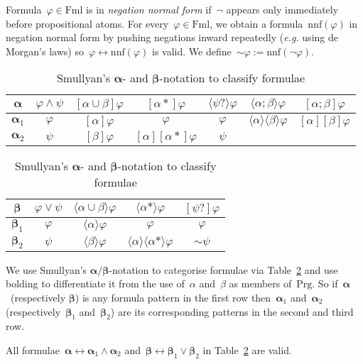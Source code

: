 \documentclass{entcs}
\newcommand{\eg}{\emph{e.g.}}
\newcommand{\pnot}[1]{\lnot #1}
\newcommand{\pneg}[1]{\sim\!#1}
\newcommand{\pand}[2]{#1 \land #2}
\newcommand{\por}[2]{#1 \lor #2}
\newcommand{\pea}[2]{\langle#1\rangle #2}
\newcommand{\paa}[2]{[#1] #2}
\newcommand{\psp}[2]{#1;#2}
\newcommand{\pup}[2]{#1\cup#2}
\newcommand{\prp}[1]{#1*}
\newcommand{\pip}[1]{#1?}
\newcommand{\peq}[2]{#1 \leftrightarrow #2}
\newcommand{\fml}{\mathrm{Fml}}
\newcommand{\prg}{\mathrm{Prg}}
\newcommand{\pnnf}[1]{\mathrm{nnf}(#1)}
\newcommand{\talpha}{\boldsymbol{\alpha}}
\newcommand{\tbeta}{\boldsymbol{\beta}}
\begin{document}
\begin{definition}
  Formula~$\varphi \in \fml$ is in \emph{negation normal form}
  if~$\pnot{}$ appears only immediately before propositional atoms.
  For every~$\varphi \in \fml$,
  we obtain a formula~$\pnnf{\varphi}$ in negation normal form
  by pushing negations inward repeatedly
  (\eg{} using de Morgan's laws)
  so~$\peq{\varphi}{\pnnf{\varphi}}$ is valid.
  We define~$\pneg{\varphi} := \pnnf{\pnot{\varphi}}$.
\end{definition}

\begin{table}[t]
  \caption{Smullyan's $\talpha$- and $\tbeta$-notation to classify formulae}
  \label{tab_alphabeta}
  \begin{center}
    \begin{tabular}{|c|c|c|c|c|c|c|}
      \hline
      $\talpha$ 
      & $\pand{\varphi}{\psi}$ 
      & $\paa{\pup{\alpha}{\beta}}{\varphi}$ 
      & $\paa{\prp{\alpha}}{\varphi}$ 
      & $\pea{\pip{\psi}}{\varphi}$ 
      & $\pea{\psp{\alpha}{\beta}}{\varphi}$ 
      & $\paa{\psp{\alpha}{\beta}}{\varphi}$ 
      \\ \hline
      $\talpha_1$ 
      & $\varphi$ 
      & $\paa{\alpha}{\varphi}$ 
      & $\varphi$ 
      & $\varphi$ 
      & $\pea{\alpha}{\pea{\beta}{\varphi}}$ 
      & $\paa{\alpha}{\paa{\beta}{\varphi}}$ 
      \\ \hline
      $\talpha_2$
      & $\psi$
      & $\paa{\beta}{\varphi}$
      & $\paa{\alpha}{\paa{\prp{\alpha}}{\varphi}}$
      & $\psi$
      & 
      & 
      \\ \hline
      \end{tabular}
      \begin{tabular}{|c|c|c|c|c|}
      \hline
      $\tbeta$ 
      & $\por{\varphi}{\psi}$ 
      & $\pea{\pup{\alpha}{\beta}}{\varphi}$ 
      & $\pea{\prp{\alpha}}{\varphi}$ 
      & $\paa{\pip{\psi}}{\varphi}$ 
      \\ \hline
      $\tbeta_1$ 
      & $\varphi$ 
      & $\pea{\alpha}{\varphi}$ 
      & $\varphi$ 
      & $\varphi$ 
      \\ \hline
      $\tbeta_2$
      & $\psi$
      & $\pea{\beta}{\varphi}$
      & $\pea{\alpha}{\pea{\prp{\alpha}}{\varphi}}$
      & $\pneg{\psi}$
      \\ \hline
    \end{tabular}
  \end{center}
\end{table}
We use Smullyan's $\talpha$/$\tbeta$-notation to categorise formulae
via Table~\ref{tab_alphabeta}
and use bolding to differentiate it from the use of~$\alpha$ and~$\beta$ as members of~$\prg$.
So if~$\talpha$~(respectively $\tbeta$) is any formula pattern in the first row
then~$\talpha_1$ and~$\talpha_2$ (respectively~$\tbeta_1$ and~$\tbeta_2$)
are its corresponding patterns in the second and third row.
\begin{proposition}
  \label{prop_axioms}
  All formulae~$\peq{\talpha}{\pand{\talpha_1}{\talpha_2}}$
  and~$\peq{\tbeta}{\por{\tbeta_1}{\tbeta_2}}$ in
  Table~\ref{tab_alphabeta} are valid.
\end{proposition}
\end{document}
